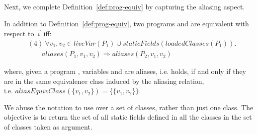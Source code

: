 \documentclass[sigconf,review,anonymous]{acmart}
\begin{document}
Next, we complete Definition~\ref{def:prog-equiv} by capturing the aliasing aspect.

\begin{definition}\label{def:prog-equiv-add}
   In addition to Definition~\ref{def:prog-equiv},
  two programs  and  are equivalent
  with respect to $\vec{i}$ iff:
\[
    \begin{aligned}
      & (4)~ \forall v_1,v_2 \in \mathit{liveVar}(P_1) \cup \mathit{staticFields}(loadedClasses(P_1)). \\
      & \qquad aliases(P_1, v_1, v_2) \Rightarrow aliases(P_2, v_1,v_2)      
    \end{aligned}
    \]
   
  \end{definition}

where, given a program , variables  and  are aliases, i.e.  holds,
if and only if they are in the same equivalence class induced by the aliasing relation,\\
  i.e. $aliasEquivClass(\{v_1,v_2\}) = \{\{v_1,v_2\}\}$.

  We abuse the notation to use  over a set of classes, rather than just one class.
  The objective is to return the set of all static fields defined in all the classes in the set of classes taken as argument.
  





\end{document}

